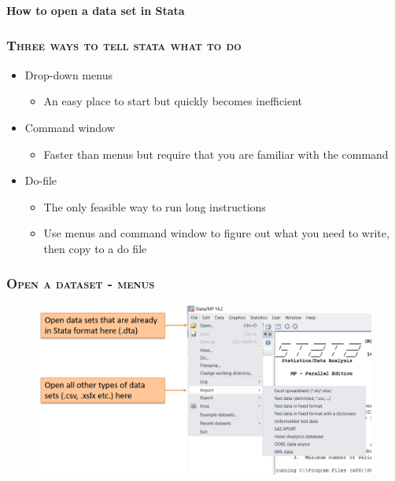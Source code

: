 \documentclass[10pt]{beamer}
\begin{document}
 
		\begin{frame}

			\frametitle{\textsc{}}
			\begin{center}
				\Large \textbf{How to open a data set in Stata} 
			\end{center}

		\end{frame}


		\begin{frame}
			\frametitle{\textsc{Three ways to tell stata what to do}}
			\begin{itemize}
				 \item Drop-down menus
				
				\begin{itemize}
					\item An easy place to start but quickly becomes inefficient
					
				\end{itemize}
				
				 \item Command window
				
			\begin{itemize}
				\item Faster than menus but require that you are familiar with the command
				
			\end{itemize}
				 \item Do-file
				
			\begin{itemize}
				\item The only feasible way to run long instructions
				
				\item Use menus and command window to figure out what you need to write, then copy to a do file
				
			\end{itemize}
			\end{itemize}
		\end{frame}



		\begin{frame}
			\frametitle{\textsc{Open a dataset - menus}}
			 \begin{figure}[H] 
				\centering
				\includegraphics[width=0.9\linewidth]{open_dataset_menu}
			\end{figure}
		\end{frame}
\end{document}
